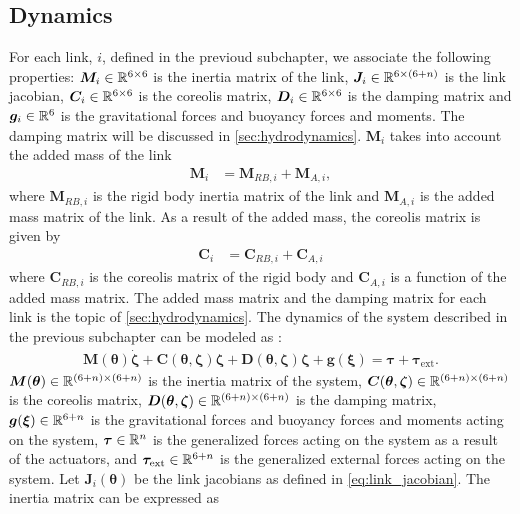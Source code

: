 \subsection{Dynamics}

For each link, $i$, defined in the previoud subchapter, we associate the following
properties: $\bm{M}_i \in \mathbb{R}^{6 \times 6}$ is the inertia matrix of the link,
$\bm{J}_i \in \mathbb{R}^{6 \times (6+n)}$ is the link jacobian, $\bm{C}_i \in \mathbb{R}^{6 \times 6}$
is the coreolis matrix, $\bm{D}_i \in \mathbb{R}^{6 \times 6}$ is the damping matrix and
$\bm{g}_i \in \mathbb{R}^{6}$ is the gravitational forces and buoyancy forces and moments.
The damping matrix will be discussed in \autoref{sec:hydrodynamics}.
$\bm{M}_i$ takes into account the added mass of the link
\begin{align}
    \bm{M}_i &= \bm{M}_{RB,i} + \bm{M}_{A,i},
\end{align}
where $\bm{M}_{RB,i}$ is the rigid body inertia matrix of the link and $\bm{M}_{A,i}$
is the added mass matrix of the link. As a result of the added mass, the coreolis
matrix is given by
\begin{align}
    \bm{C}_i &= \bm{C}_{RB,i} + \bm{C}_{A,i}
\end{align}
where $\bm{C}_{RB,i}$ is the coreolis matrix of the rigid body and $\bm{C}_{A,i}$
is a function of the added mass matrix. The added mass matrix and the damping matrix
for each link is the topic of \autoref{sec:hydrodynamics}. The dynamics of the
system described in the previous subchapter can be modeled as
\cite{from2014}:
\begin{align}
    \bm{M}(\bm{\theta})\dot{\bm{\zeta}} +
        \bm{C}(\bm{\theta}, \bm{\zeta}) \bm{\zeta} +
        \bm{D}(\bm{\theta}, \bm{\zeta}) \bm{\zeta} +
        \bm{g}(\bm{\xi}) =
        \bm{\tau} + \bm{\tau}_{\mathrm{ext}}.
\end{align}
$\bm{M}(\bm{\theta}) \in \mathbb{R}^{(6+n)\times(6+n)}$  is the inertia matrix of the
system, $\bm{C}(\bm{\theta}, \bm{\zeta}) \in \mathbb{R}^{(6+n)\times(6+n)}$ is the
coreolis matrix, $\bm{D}(\bm{\theta}, \bm{\zeta}) \in \mathbb{R}^{(6+n)\times(6+n)}$ is
the damping matrix, $\bm{g}(\bm{\xi}) \in \mathbb{R}^{6+n}$ is the gravitational forces
and buoyancy forces and moments acting on the system, $\bm{\tau} \in \mathbb{R}^{n}$ is the generalized
forces acting on the system as a result of the actuators,
and $\bm{\tau}_{\mathrm{ext}} \in \mathbb{R}^{6+n}$ is the
generalized external forces acting on the system. Let $\bm{J}_{i}(\bm{\theta})$
be the link jacobians as defined in \autoref{eq:link_jacobian}.
The inertia matrix
can be expressed as
